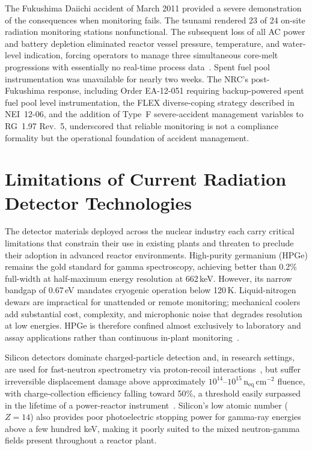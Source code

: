 The Fukushima Daiichi accident of March 2011 provided a severe demonstration
of the consequences when monitoring fails. The tsunami rendered 23 of 24
on-site radiation monitoring stations nonfunctional. The subsequent loss of
all AC power and battery depletion eliminated reactor vessel pressure,
temperature, and water-level indication, forcing operators to manage three
simultaneous core-melt progressions with essentially no real-time process
data~\cite{NCBI_Fukushima_Lessons, NAS_Fukushima_2016}. Spent fuel pool
instrumentation was unavailable for nearly two weeks. The NRC's
post-Fukushima response, including Order EA-12-051 requiring backup-powered
spent fuel pool level instrumentation, the FLEX diverse-coping strategy
described in NEI~12-06, and the addition of Type~F severe-accident management
variables to RG~1.97 Rev.~5, underscored that reliable monitoring is not a
compliance formality but the operational foundation of accident management.

\section{Limitations of Current Radiation Detector Technologies}

The detector materials deployed across the nuclear industry each carry
critical limitations that constrain their use in existing plants and threaten
to preclude their adoption in advanced reactor environments. High-purity
germanium (HPGe) remains the gold standard for gamma spectroscopy, achieving
better than 0.2\% full-width at half-maximum energy resolution at 662\,keV.
However, its narrow bandgap of 0.67\,eV mandates cryogenic operation below
120\,K. Liquid-nitrogen dewars are impractical for unattended or remote
monitoring; mechanical coolers add substantial cost, complexity, and
microphonic noise that degrades resolution at low energies. HPGe is therefore
confined almost exclusively to laboratory and assay applications rather than
continuous in-plant monitoring~\cite{Springer_HPGe_Cooling}.

Silicon detectors dominate charged-particle detection and, in research
settings, are used for fast-neutron spectrometry via proton-recoil
interactions~\cite{Nature_SiDamage}, but suffer irreversible displacement
damage above approximately $10^{14}$--$10^{15}$\,n$_\mathrm{eq}$\,cm$^{-2}$
fluence, with charge-collection efficiency falling toward 50\%, a threshold
easily surpassed in the lifetime of a power-reactor
instrument~\cite{Nature_SiDamage}. Silicon's low atomic number ($Z = 14$)
also provides poor photoelectric stopping power for gamma-ray energies above
a few hundred keV, making it poorly suited to the mixed neutron-gamma fields
present throughout a reactor plant.


